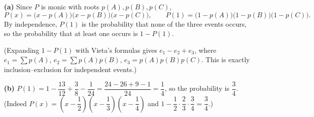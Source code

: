\textbf{(a)} Since $P$ is monic with roots $p(A),p(B),p(C)$,
\[P(x)=\bigl(x-p(A)\bigr)\bigl(x-p(B)\bigr)\bigl(x-p(C)\bigr),\qquad P(1)=\bigl(1-p(A)\bigr)\bigl(1-p(B)\bigr)\bigl(1-p(C)\bigr).\]
By independence, $P(1)$ is the probability that none of the three events occurs, so the probability that at least one occurs is $1-P(1)$.

(Expanding $1-P(1)$ with Vieta's formulas gives $e_1-e_2+e_3$, where $e_1=\sum p(A)$, $e_2=\sum p(A)p(B)$, $e_3=p(A)p(B)p(C)$. This is exactly inclusion--exclusion for independent events.)

\textbf{(b)} $P(1)=1-\dfrac{13}{12}+\dfrac38-\dfrac1{24}=\dfrac{24-26+9-1}{24}=\dfrac14$, so the probability is $\boxed{\dfrac34}$. (Indeed $P(x)=\left(x-\dfrac12\right)\left(x-\dfrac13\right)\left(x-\dfrac14\right)$ and $1-\dfrac12\cdot\dfrac23\cdot\dfrac34=\dfrac34$.)
